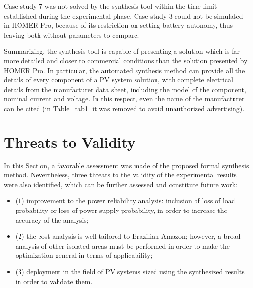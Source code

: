 Case study $7$ was not solved by the synthesis tool within the time limit established during the experimental phase. Case study $3$ could not be simulated in HOMER Pro, because of its restriction on setting battery autonomy, thus leaving both without parameters to compare.

Summarizing, the synthesis tool is capable of presenting a solution which is far more detailed and closer to commercial conditions than the solution presented by HOMER Pro. In particular, the automated synthesis method can provide all the details of every component of a PV system solution, with complete electrical details from the manufacturer data sheet, including  the model of the component, nominal current and voltage. In this respect, even the name of the manufacturer can be cited (in Table~\ref{tab1} it was removed to avoid unauthorized advertising).

\section{Threats to Validity}

In this Section, a favorable assessment was made of the proposed formal synthesis method. Nevertheless, three threats to the validity of the experimental results were also identified, which can be further assessed and 
constitute future work: 

\begin{itemize}
\item ($1$) improvement to the power reliability analysis: inclusion of loss of load probability or loss of power supply probability, in order to increase the accuracy of the analysis; 
\item ($2$) the cost analysis is well tailored to Brazilian Amazon; however, a broad analysis of other isolated areas must be  performed in order to make the optimization general in terms of applicability; 
\item ($3$) deployment in the field of PV systems sized using the synthesized results in order to validate them.
\end{itemize}


